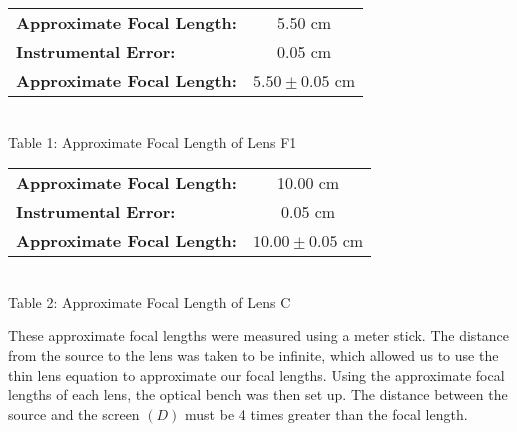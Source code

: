 \begin{center}
        \begin{tabular}{|l c|}
        \hline
        \textbf{Approximate Focal Length: } & 5.50 cm \\
        \textbf{Instrumental Error:} & 0.05 cm \\
        \textbf{Approximate Focal Length:} & $5.50\pm0.05$ cm \\ \hline        
        \end{tabular}
        \vspace{3mm}
        \\Table 1: Approximate Focal Length of Lens F1
        \vspace{5mm}\\
        \begin{tabular}{|l c|}
            \hline
            \textbf{Approximate Focal Length: } & 10.00 cm \\
            \textbf{Instrumental Error:} & 0.05 cm \\
            \textbf{Approximate Focal Length:} & $10.00\pm0.05$ cm \\ \hline        
        \end{tabular}
        \vspace{3mm}
        \\Table 2: Approximate Focal Length of Lens C\\
        \vspace{3mm}
    \end{center}
These approximate focal lengths were measured using a meter stick. 
The distance from the source to the lens was taken to be infinite, which allowed us to use the thin lens equation to approximate  our focal lengths. 
Using the approximate focal lengths of each lens, the optical bench was then set up. 
The distance between the source and the screen $(D)$ must be 4 times greater than the focal length.\\
